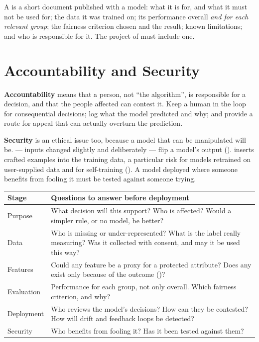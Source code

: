 \begin{definitionbox}
A  is a short document published with a model: what it is for, and
what it must not be used for; the data it was trained on; its performance overall
\emph{and for each relevant group}; the fairness criterion chosen and the result; known
limitations; and who is responsible for it. The project of  must include
one.
\end{definitionbox}

\section{Accountability and Security}

\textbf{Accountability} means that a person, not ``the algorithm'', is responsible for
a decision, and that the people affected can contest it. Keep a human in the loop for
consequential decisions; log what the model predicted and why; and provide a route for
appeal that can actually overturn the prediction.

\textbf{Security} is an ethical issue too, because a model that can be manipulated will
be.  --- inputs changed slightly and deliberately --- flip a
model's output ().  inserts crafted examples into the
training data, a particular risk for models retrained on user-supplied data and for
self-training (). A model deployed where someone benefits from fooling
it must be tested against someone trying.

\begin{longtable}{@{}L{3.6cm}L{11.4cm}@{}}
\toprule
{}
\textbf{Stage} & \textbf{Questions to answer before deployment} \\
\midrule
\endhead
Purpose & What decision will this support? Who is affected? Would a simpler rule, or no
model, be better? \\
Data & Who is missing or under-represented? What is the label really measuring? Was it
collected with consent, and may it be used this way? \\
Features & Could any feature be a proxy for a protected attribute? Does any exist only
because of the outcome ()? \\
Evaluation & Performance for each group, not only overall. Which fairness criterion,
and why? \\
Deployment & Who reviews the model's decisions? How can they be contested? How will
drift and feedback loops be detected? \\
Security & Who benefits from fooling it? Has it been tested against them? \\
\bottomrule
\end{longtable}

